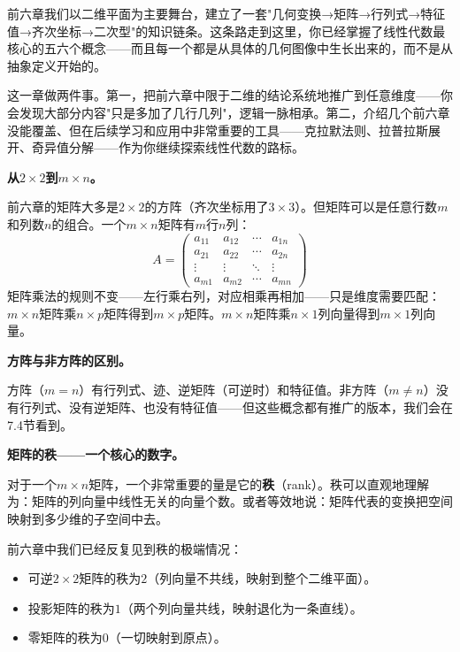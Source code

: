
前六章我们以二维平面为主要舞台，建立了一套"几何变换→矩阵→行列式→特征值→齐次坐标→二次型"的知识链条。这条路走到这里，你已经掌握了线性代数最核心的五六个概念——而且每一个都是从具体的几何图像中生长出来的，而不是从抽象定义开始的。

这一章做两件事。第一，把前六章中限于二维的结论系统地推广到任意维度——你会发现大部分内容"只是多加了几行几列"，逻辑一脉相承。第二，介绍几个前六章没能覆盖、但在后续学习和应用中非常重要的工具——克拉默法则、拉普拉斯展开、奇异值分解——作为你继续探索线性代数的路标。


\textbf{从$2\times2$到$m\times n$。}

前六章的矩阵大多是$2\times2$的方阵（齐次坐标用了$3\times3$）。但矩阵可以是任意行数$m$和列数$n$的组合。一个$m\times n$矩阵有$m$行$n$列：
\[
A = \begin{pmatrix}
a_{11} & a_{12} & \cdots & a_{1n}\\
a_{21} & a_{22} & \cdots & a_{2n}\\
\vdots & \vdots & \ddots & \vdots\\
a_{m1} & a_{m2} & \cdots & a_{mn}
\end{pmatrix}
\]
矩阵乘法的规则不变——左行乘右列，对应相乘再相加——只是维度需要匹配：$m\times n$矩阵乘$n\times p$矩阵得到$m\times p$矩阵。$m\times n$矩阵乘$n\times1$列向量得到$m\times1$列向量。

\textbf{方阵与非方阵的区别。}

方阵（$m=n$）有行列式、迹、逆矩阵（可逆时）和特征值。非方阵（$m\neq n$）没有行列式、没有逆矩阵、也没有特征值——但这些概念都有推广的版本，我们会在7.4节看到。

\textbf{矩阵的秩——一个核心的数字。}

对于一个$m\times n$矩阵，一个非常重要的量是它的\textbf{秩}（rank）。秩可以直观地理解为：矩阵的列向量中线性无关的向量个数。或者等效地说：矩阵代表的变换把空间映射到多少维的子空间中去。

前六章中我们已经反复见到秩的极端情况：
\begin{itemize}
\item 可逆$2\times2$矩阵的秩为$2$（列向量不共线，映射到整个二维平面）。
\item 投影矩阵的秩为$1$（两个列向量共线，映射退化为一条直线）。
\item 零矩阵的秩为$0$（一切映射到原点）。
\end{itemize}

